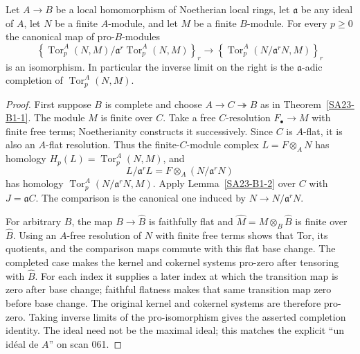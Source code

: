 \begin{theorem}\label{SA23-B1-3}
Let $A\to B$ be a local homomorphism of Noetherian local rings,
let $\mathfrak a$ be any ideal of $A$, let $N$ be a finite $A$-module,
and let $M$ be a finite $B$-module.  For every $p\ge0$ the canonical
map of pro-$B$-modules
\[
 \left\{\operatorname{Tor}^A_p(N,M)\big/
      \mathfrak a^r\operatorname{Tor}^A_p(N,M)\right\}_r
 \longrightarrow
 \left\{\operatorname{Tor}^A_p(N/\mathfrak a^rN,M)\right\}_r
\]
is an isomorphism.  In particular the inverse limit on the right is
the $\mathfrak a$-adic completion of $\operatorname{Tor}^A_p(N,M)$.
\end{theorem}
\begin{proof}
First suppose $B$ is complete and choose $A\to C\twoheadrightarrow B$
as in Theorem~\ref{SA23-B1-1}.  The module $M$ is finite over $C$.
Take a free $C$-resolution $F_\bullet\to M$ with finite free terms;
Noetherianity constructs it successively.  Since $C$ is $A$-flat,
it is also an $A$-flat resolution.  Thus the finite-$C$-module complex
$L=F\otimes_A N$ has homology
$H_p(L)=\operatorname{Tor}^A_p(N,M)$, and
\[
 L/\mathfrak a^rL=F\otimes_A(N/\mathfrak a^rN)
\]
has homology $\operatorname{Tor}^A_p(N/\mathfrak a^rN,M)$.
Apply Lemma~\ref{SA23-B1-2} over $C$ with $J=\mathfrak aC$.
The comparison is the canonical one induced by $N\to N/\mathfrak a^rN$.

For arbitrary $B$, the map $B\to\widehat B$ is faithfully flat
\cite[Lemma 10.97.3]{algStacksNoetherianCompletion} and
$\widehat M=M\otimes_B\widehat B$ is finite over $\widehat B$.
Using an $A$-free resolution of $N$ with finite free terms shows that
Tor, its quotients, and the comparison maps commute with this flat
base change.  The completed case makes the kernel and cokernel
systems pro-zero after tensoring with $\widehat B$.  For each index
it supplies a later index at which the transition map is zero after
base change; faithful flatness makes that same transition map zero
before base change.  The original kernel and cokernel systems are
therefore pro-zero.  Taking inverse limits of the pro-isomorphism
gives the asserted completion identity.  The ideal need not be the
maximal ideal; this matches the explicit ``un id\'eal de $A$'' on
scan 061.
\end{proof}
